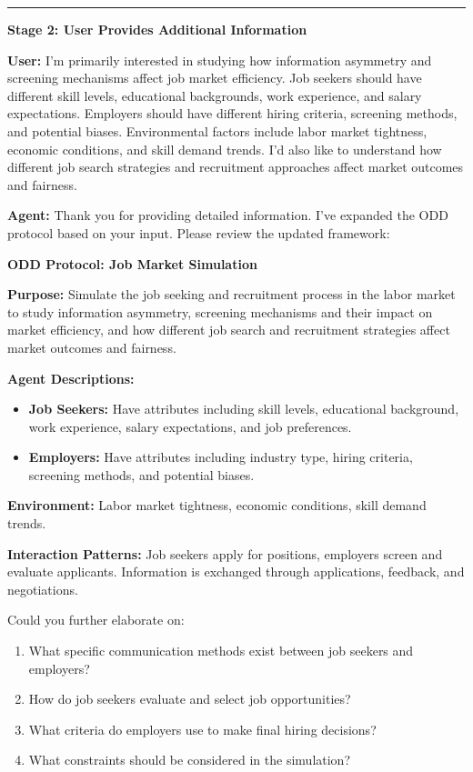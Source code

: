\documentclass{article}
\theoremstyle{definition}
\theoremstyle{theorem}
\theoremstyle{proof}
\theoremstyle{remark}
\begin{document}
\begin{tcolorbox}
\vspace{1em}
\hrule
\vspace{1em}

\textbf{Stage 2: User Provides Additional Information}

\textbf{User:} I'm primarily interested in studying how information asymmetry and screening mechanisms affect job market efficiency. Job seekers should have different skill levels, educational backgrounds, work experience, and salary expectations. Employers should have different hiring criteria, screening methods, and potential biases. Environmental factors include labor market tightness, economic conditions, and skill demand trends. I'd also like to understand how different job search strategies and recruitment approaches affect market outcomes and fairness.

\textbf{Agent:} Thank you for providing detailed information. I've expanded the ODD protocol based on your input. Please review the updated framework:

\begin{tcolorbox}[
    colback=gray!5,
    colframe=gray!40!black,
    boxrule=0.3mm,
    arc=1mm
]
\textbf{ODD Protocol: Job Market Simulation}

\textbf{Purpose:} Simulate the job seeking and recruitment process in the labor market to study information asymmetry, screening mechanisms and their impact on market efficiency, and how different job search and recruitment strategies affect market outcomes and fairness.

\textbf{Agent Descriptions:}
\begin{itemize}
    \item \textbf{Job Seekers:} Have attributes including skill levels, educational background, work experience, salary expectations, and job preferences.
    \item \textbf{Employers:} Have attributes including industry type, hiring criteria, screening methods, and potential biases.
\end{itemize}

\textbf{Environment:}
Labor market tightness, economic conditions, skill demand trends.

\textbf{Interaction Patterns:}
Job seekers apply for positions, employers screen and evaluate applicants. Information is exchanged through applications, feedback, and negotiations.
\end{tcolorbox}

Could you further elaborate on:
\begin{enumerate}
    \item What specific communication methods exist between job seekers and employers?
    \item How do job seekers evaluate and select job opportunities?
    \item What criteria do employers use to make final hiring decisions?
    \item What constraints should be considered in the simulation?
\end{enumerate}



\end{tcolorbox}
\end{document}
